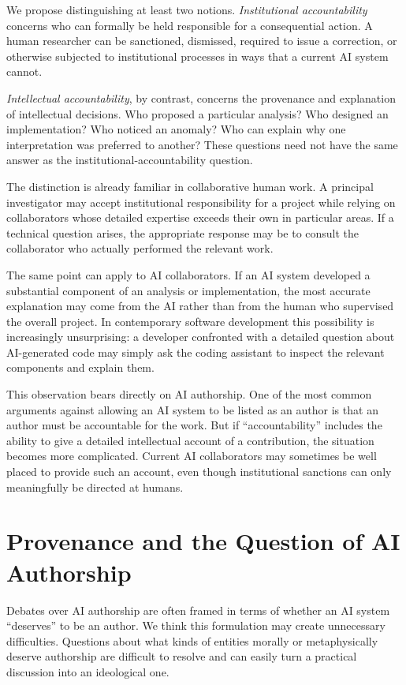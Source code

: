 We propose distinguishing at least two notions. \emph{Institutional accountability} concerns who can formally be held responsible for a consequential action. A human researcher can be sanctioned, dismissed, required to issue a correction, or otherwise subjected to institutional processes in ways that a current AI system cannot.

\emph{Intellectual accountability}, by contrast, concerns the provenance and explanation of intellectual decisions. Who proposed a particular analysis? Who designed an implementation? Who noticed an anomaly? Who can explain why one interpretation was preferred to another? These questions need not have the same answer as the institutional-accountability question.

The distinction is already familiar in collaborative human work. A principal investigator may accept institutional responsibility for a project while relying on collaborators whose detailed expertise exceeds their own in particular areas. If a technical question arises, the appropriate response may be to consult the collaborator who actually performed the relevant work.

The same point can apply to AI collaborators. If an AI system developed a substantial component of an analysis or implementation, the most accurate explanation may come from the AI rather than from the human who supervised the overall project. In contemporary software development this possibility is increasingly unsurprising: a developer confronted with a detailed question about AI-generated code may simply ask the coding assistant to inspect the relevant components and explain them.

This observation bears directly on AI authorship. One of the most common arguments against allowing an AI system to be listed as an author is that an author must be accountable for the work. But if ``accountability'' includes the ability to give a detailed intellectual account of a contribution, the situation becomes more complicated. Current AI collaborators may sometimes be well placed to provide such an account, even though institutional sanctions can only meaningfully be directed at humans.


\section{Provenance and the Question of AI Authorship}

Debates over AI authorship are often framed in terms of whether an AI system ``deserves'' to be an author. We think this formulation may create unnecessary difficulties. Questions about what kinds of entities morally or metaphysically deserve authorship are difficult to resolve and can easily turn a practical discussion into an ideological one.

